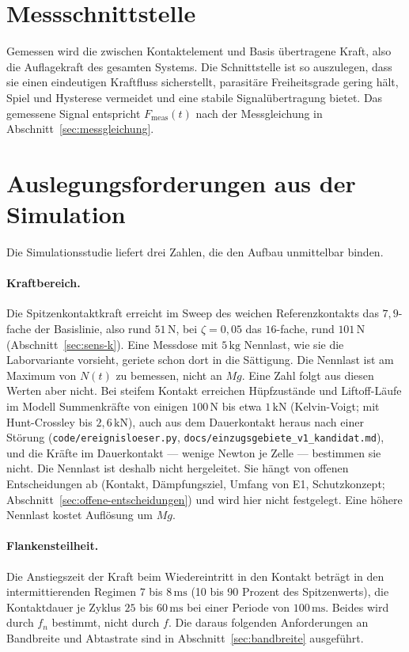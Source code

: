 \documentclass[12pt,a4paper]{report}
\begin{document}
\section{Messschnittstelle}

Gemessen wird die zwischen Kontaktelement und Basis übertragene Kraft,
also die Auflagekraft des gesamten Systems. Die Schnittstelle ist so
auszulegen, dass sie einen eindeutigen Kraftfluss sicherstellt,
parasitäre Freiheitsgrade gering hält, Spiel und Hysterese vermeidet und
eine stabile Signalübertragung bietet. Das gemessene Signal entspricht
$F_{\mathrm{meas}}(t)$ nach der Messgleichung in
Abschnitt~\ref{sec:messgleichung}.

\section{Auslegungsforderungen aus der Simulation}
\label{sec:auslegung-sim}

Die Simulationsstudie liefert drei Zahlen, die den Aufbau unmittelbar
binden.

\paragraph{Kraftbereich.}
Die Spitzenkontaktkraft erreicht im Sweep des weichen Referenzkontakts
das $7{,}9$-fache der Basislinie, also rund $51\,\mathrm{N}$, bei
$\zeta = 0{,}05$ das $16$-fache, rund $101\,\mathrm{N}$
(Abschnitt~\ref{sec:sens-k}). Eine Messdose mit $5\,\mathrm{kg}$
Nennlast, wie sie die Laborvariante vorsieht, geriete schon dort in die
Sättigung. Die Nennlast ist am Maximum von $N(t)$ zu bemessen, nicht an
$Mg$. Eine Zahl folgt aus diesen Werten aber nicht. Bei steifem Kontakt
erreichen Hüpfzustände und Liftoff-Läufe im Modell Summenkräfte von
einigen $100\,\mathrm{N}$ bis etwa $1\,\mathrm{kN}$ (Kelvin-Voigt; mit
Hunt-Crossley bis $2{,}6\,\mathrm{kN}$), auch aus dem
Dauerkontakt heraus nach einer Störung
(\texttt{code/ereignisloeser.py}, \texttt{docs/einzugsgebiete\_v1\_kandidat.md}),
und die Kräfte im Dauerkontakt --- wenige Newton je Zelle --- bestimmen
sie nicht. Die Nennlast ist deshalb nicht hergeleitet. Sie hängt von
offenen Entscheidungen ab (Kontakt, Dämpfungsziel, Umfang von E1,
Schutzkonzept; Abschnitt~\ref{sec:offene-entscheidungen}) und wird hier
nicht festgelegt. Eine höhere Nennlast kostet Auflösung um $Mg$.

\paragraph{Flankensteilheit.}
Die Anstiegszeit der Kraft beim Wiedereintritt in den Kontakt beträgt
in den intermittierenden Regimen $7$ bis $8\,\mathrm{ms}$ (10 bis
90 Prozent des Spitzenwerts), die Kontaktdauer je Zyklus $25$ bis
$60\,\mathrm{ms}$ bei einer Periode von $100\,\mathrm{ms}$. Beides wird
durch $f_n$ bestimmt, nicht durch $f$. Die daraus folgenden
Anforderungen an Bandbreite und Abtastrate sind in
Abschnitt~\ref{sec:bandbreite} ausgeführt.
\end{document}
